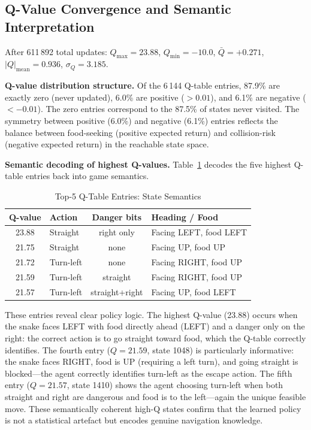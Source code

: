 \documentclass[10pt,conference]{IEEEtran}
\begin{document}
\subsection{Q-Value Convergence and Semantic Interpretation}
\label{sec:qvalue}

After 611\,892 total updates:
$Q_{\max}=23.88$, $Q_{\min}=-10.0$, $\bar{Q}=+0.271$,
$|Q|_{\text{mean}}=0.936$, $\sigma_Q=3.185$.

\textbf{Q-value distribution structure.}
Of the 6\,144 Q-table entries, 87.9\% are exactly zero
(never updated), 6.0\% are positive ($>0.01$), and
6.1\% are negative ($<-0.01$).
The zero entries correspond to the 87.5\% of states
never visited.
The symmetry between positive (6.0\%) and negative (6.1\%)
entries reflects the balance between food-seeking (positive
expected return) and collision-risk (negative expected return)
in the reachable state space.

\textbf{Semantic decoding of highest Q-values.}
Table~\ref{tab:topq} decodes the five highest Q-table entries
back into game semantics.

\begin{table}[h]
  \centering
  \caption{Top-5 Q-Table Entries: State Semantics}
  \label{tab:topq}
  \begin{tabular}{clcl}
    \toprule
    Q-value & Action & Danger bits & Heading / Food \\
    \midrule
    23.88 & Straight & right only    & Facing LEFT, food LEFT \\
    21.75 & Straight & none          & Facing UP, food UP \\
    21.72 & Turn-left & none         & Facing RIGHT, food UP \\
    21.59 & Turn-left & straight     & Facing RIGHT, food UP \\
    21.57 & Turn-left & straight+right & Facing UP, food LEFT \\
    \bottomrule
  \end{tabular}
\end{table}

These entries reveal clear policy logic.
The highest Q-value (23.88) occurs when the snake faces LEFT with
food directly ahead (LEFT) and a danger only on the right:
the correct action is to go straight toward food, which the
Q-table correctly identifies.
The fourth entry ($Q=21.59$, state 1048) is particularly
informative: the snake faces RIGHT, food is UP (requiring a
left turn), and going straight is blocked---the agent correctly
identifies turn-left as the escape action.
The fifth entry ($Q=21.57$, state 1410) shows the agent choosing
turn-left when both straight and right are dangerous and food is
to the left---again the unique feasible move.
These semantically coherent high-Q states confirm that the learned
policy is not a statistical artefact but encodes genuine
navigation knowledge.
\end{document}
